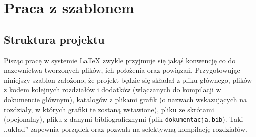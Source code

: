 
\chapter{Praca z szablonem}
\section{Struktura projektu}
Pisząc pracę w systemie LaTeX zwykle przyjmuje się jakąś konwencję co do nazewnictwa tworzonych plików, ich położenia oraz powiązań. Przygotowując niniejszy szablon założono, że projekt będzie się składał z pliku głównego, plików z kodem kolejnych rozdziałów i dodatków (włączanych do kompilacji w dokumencie głównym), katalogów z plikami grafik (o nazwach wskazujących na rozdziały, w których grafiki te zostaną wstawione), pliku ze skrótami (opcjonalny), pliku z danymi bibliograficznymi (plik \texttt{dokumentacja.bib}). Taki ,,układ'' zapewnia porządek oraz pozwala na selektywną kompilację rozdziałów. 

